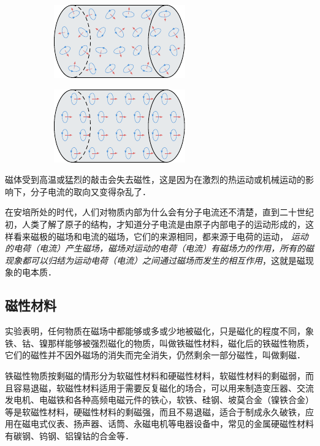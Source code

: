 \begin{figure}[htbp]
    \centering
    \begin{subfigure}{0.4\linewidth}
        \centering
        \includegraphics{fig/C/1-11a.pdf}
        \caption{}\label{fig_C_1-11a}
    \end{subfigure}
    \hfil
    \begin{subfigure}{0.4\linewidth}
        \centering
        \includegraphics{fig/C/1-11b.pdf}
        \caption{}\label{fig_C_1-11b}
    \end{subfigure}
    \caption{}\label{fig_C_1-11}
\end{figure}

磁体受到高温或猛烈的敲击会失去磁性，这是因为在激烈的热运动或机械运动的影响下，分子电流的取向又变得杂乱了．

在安培所处的时代，人们对物质内部为什么会有分子电流还不清楚，直到二十世纪初，人类了解了原子的结构，才知道分子电流是由原子内部电子的运动形成的，这样看来磁极的磁场和电流的磁场，它们的来源相同，都来源于电荷的运动，
\textit{运动的电荷（电流）产生磁场，磁场对运动的电荷（电流）有磁场力的作用，所有的磁现象都可以归结为运动电荷（电流）之间通过磁场而发生的相互作用}，这就是磁现象的电本质．

\subsection{磁性材料}

实验表明，任何物质在磁场中都能够或多或少地被磁化，只是磁化的程度不同，象铁、钴、镍那样能够被强烈磁化的物质，叫做铁磁性材料，磁化后的铁磁性物质，它们的磁性并不因外磁场的消失而完全消失，仍然剩余一部分磁性，叫做剩磁．

铁磁性物质按剩磁的情形分为软磁性材料和硬磁性材料，软磁性材料的剩磁弱，而且容易退磁，软磁性材料适用于需要反复磁化的场合，可以用来制造变压器、交流发电机、电磁铁和各种高频电磁元件的铁心，软铁、硅钢、坡莫合金（镍铁合金）等是软磁性材料，硬磁性材料的剩磁强，而且不易退磁，适合于制成永久破铁，应用在磁电式仪表、扬声器、话筒、永磁电机等电器设备中，常见的金属硬磁性材料有碳钢、钨钢、铝镍钴的合金等．


